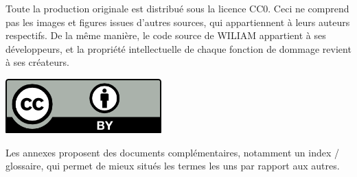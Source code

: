 \begin{tcolorbox}[title=License]
    Toute la production originale est distribué sous la licence CC0. Ceci ne comprend pas les images et figures issues d'autres sources, qui appartiennent à leurs auteurs respectifs. De la même manière, le code source de WILIAM appartient à ses développeurs, et la propriété intellectuelle de chaque fonction de dommage revient à ses créateurs. \\

     \begin{center}
        \begin{minipage}{0.3\textwidth} %
            \centering
            \includegraphics[width=6cm]{illustrations/ccby.png}
            \label{fig:ccby2}
        \end{minipage}%
    \end{center}

\end{tcolorbox}


Les annexes proposent des documents complémentaires, notamment un index / glossaire, qui permet de mieux situés les termes les uns par rapport aux autres. 

